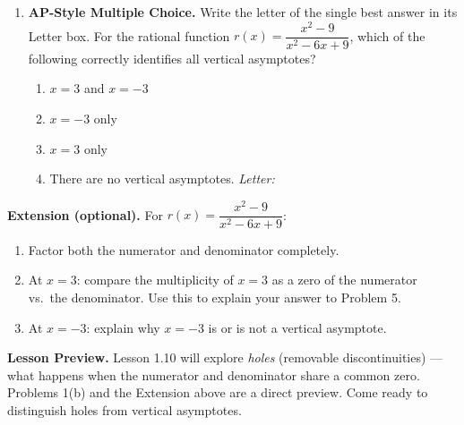 \documentclass[10pt]{article}
\begin{document}
\begin{enumerate}[itemsep=14pt]
      \rubricbox[0.3in]{\gradedblank[id=hw4, type=rubric, points=3,
  display={Yes, $x = 2$ is a vertical asymptote: $r(x)$ grows without bound on both sides. The graph rises steeply toward the asymptote from the left and from the right.}]{\linewidth}{50pt}}

\item \textbf{AP-Style Multiple Choice.} Write the letter of the single best answer in its Letter box. For the rational function
$r(x) = \dfrac{x^2 - 9}{x^2 - 6x + 9}$, which of the following correctly identifies all
vertical asymptotes?

\begin{enumerate}[label=(\Alph*), itemsep=3pt]
  \item $x = 3$ and $x = -3$
  \item $x = -3$ only
  \item $x = 3$ only
  \item There are no vertical asymptotes. \hfill\textit{Letter:}~\gradedblank[id=hw5, type=choice, points=1, answer=C]{0.42in}{13pt}
\end{enumerate}

\end{enumerate}

\vspace{0.1in}

\newpage
\begin{extensionbox}
\textbf{Extension (optional).} For $r(x) = \dfrac{x^2 - 9}{x^2 - 6x + 9}$:
\begin{enumerate}[label=(\alph*), itemsep=4pt]
  \item Factor both the numerator and denominator completely.
  \item At $x = 3$: compare the multiplicity of $x = 3$ as a zero of the numerator vs.\ the
        denominator. Use this to explain your answer to Problem 5.
  \item At $x = -3$: explain why $x = -3$ is or is not a vertical asymptote.
\end{enumerate}
\end{extensionbox}

\vspace{0.1in}

\begin{reflectionbox}
\textbf{Lesson Preview.} Lesson 1.10 will explore \textit{holes} (removable discontinuities)
--- what happens when the numerator and denominator share a common zero. Problems 1(b) and
the Extension above are a direct preview. Come ready to distinguish holes from vertical asymptotes.
\end{reflectionbox}
\end{document}
